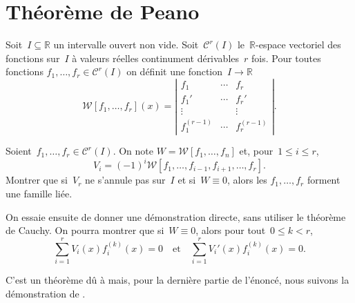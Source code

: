 \section{Théorème de Peano}

Soit~$I \subseteq \mathbb{R}$ un intervalle ouvert non vide.
Soit~$\mathcal{C}^r(I)$ le~$\mathbb{R}$-espace vectoriel des fonctions sur~$I$
à valeurs réelles continument dérivables~$r$ fois. Pour toutes fonctions
$f_1,\dotsc,f_r \in \mathcal{C}^r(I)$
on définit une fonction~$I\to \mathbb{R}$
\[ \mathcal{W}[f_1,\dotsc,f_r](x) = \left|
    \begin{matrix}
      f_1 & \dotsb & f_r \\
      f_1' & \dotsb & f_r' \\
      \vdots & & \vdots \\
      f_1^{(r-1)} & \dotsb & f_r^{(r-1)}
    \end{matrix}
  \right|. \]

Soient~$f_1,\dotsc,f_r \in \mathcal{C}^r(I)$.
On note $W = \mathcal{W}[f_1,\dotsc,f_n]$
et, pour~$1\leq i\leq r$,
\[ V_i = (-1)^i \mathcal{W}[f_1,\dotsc,f_{i-1},f_{i+1},\dotsc,f_r]. \]
Montrer que si~$V_r$ ne s'annule pas sur~$I$ et si~$W \equiv 0$, alors les $f_1,\dotsc,f_r$ forment une famille liée.

On essaie ensuite de donner une démonstration directe, sans utiliser le théorème de Cauchy.
On pourra montrer que si~$W \equiv 0$, alors pour tout~$0\leq k< r$,
\[ \sum_{i=1}^r V_i(x) f_i^{(k)}(x) = 0 \quad\text{et}\quad  \sum_{i=1}^r V_i'(x) f_i^{(k)}(x) = 0. \]


\begin{em}
  C'est un théorème dû à \textcite{Peano_1889} mais, pour la dernière partie de l'énoncé, nous suivons la démonstration de \textcite{Bocher_1900}.
\end{em}


